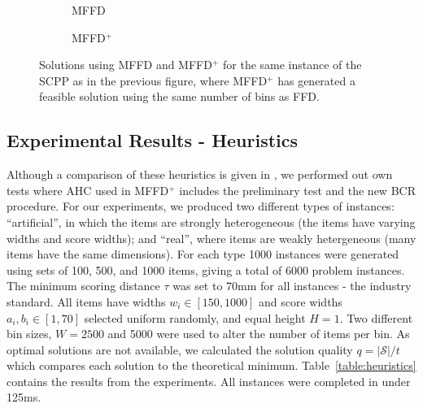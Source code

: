 \documentclass[authoryear]{elsarticle}
\begin{document}
\begin{figure}[H]	
	\centering
	\begin{subfigure}[h]{0.35\textwidth}
		
		\caption{MFFD}
		\label{fig:mffd}
	\end{subfigure} \hspace{10mm}
	\begin{subfigure}[h]{0.35\textwidth}
		
		\caption{MFFD$^+$}
		\label{fig:mffdplus}
	\end{subfigure}
	\caption{Solutions using MFFD and MFFD$^+$ for the same instance of the SCPP as in the previous figure, where MFFD$^+$ has generated a feasible solution using the same number of bins as FFD.}
	\label{fig:mffdvsmffdplus}
\end{figure}


\subsection{Experimental Results - Heuristics}
\label{sub:expheuristics}
\noindent Although a comparison of these heuristics is given in \citet{hawa2018}, we performed out own tests where AHC used in MFFD$^+$ includes the preliminary test and the new BCR procedure. For our experiments, we produced two different types of instances: ``artificial'', in which the items are strongly heterogeneous (the items have varying widths and score widths); and ``real'', where items are weakly hetergeneous (many items have the same dimensions). For each type 1000 instances were generated using sets of 100, 500, and 1000 items, giving a total of 6000 problem instances. The minimum scoring distance $\tau$ was set to 70mm for all instances - the industry standard. All items have widths $w_i \in [150,1000]$ and score widths $a_i, b_i \in [1,70]$ selected uniform randomly, and equal height $H=1$. Two different bin sizes, $W = 2500$ and 5000 were used to alter the number of items per bin. As optimal solutions are not available, we calculated the solution quality $q = |\mathcal{S}|/ t$ which compares each solution to the theoretical minimum. Table~\ref{table:heuristics} contains the results from the experiments. All instances were completed in under 125ms.
\end{document}
